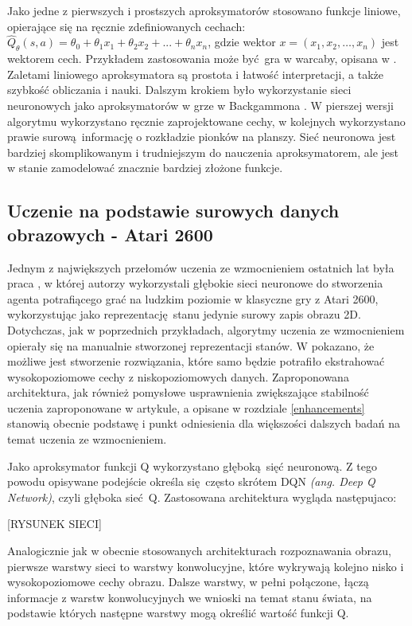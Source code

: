 Jako jedne z pierwszych i prostszych aproksymatorów stosowano funkcje liniowe, opierające się na ręcznie zdefiniowanych cechach: $\hat{Q}_{\theta}(s,a) = \theta_0 + \theta_1x_1 + \theta_2x_2 + ... + \theta_nx_n$, gdzie wektor $x = (x_1, x_2, …, x_n)$ jest wektorem cech. Przykładem zastosowania może być gra w warcaby, opisana w \cite{Samuel:1959:SML:1661923.1661924}. Zaletami liniowego aproksymatora są prostota i łatwość interpretacji, a także szybkość obliczania i nauki. 
Dalszym krokiem było wykorzystanie sieci neuronowych jako aproksymatorów w grze w Backgammona \cite{Tesauro1992451}. W pierszej wersji algorytmu wykorzystano ręcznie zaprojektowane cechy, w kolejnych wykorzystano prawie surową informację o rozkładzie pionków na planszy. Sieć neuronowa jest bardziej skomplikowanym i trudniejszym do nauczenia aproksymatorem, ale jest w stanie zamodelować znacznie bardziej złożone funkcje.

\subsection{Uczenie na podstawie surowych danych obrazowych - Atari 2600}

Jednym z największych przełomów uczenia ze wzmocnieniem ostatnich lat była praca \cite{mnih2015human}, w której autorzy wykorzystali głębokie sieci neuronowe do stworzenia agenta potrafiącego grać na ludzkim poziomie w klasyczne gry z Atari 2600, wykorzystując jako reprezentację stanu jedynie surowy zapis obrazu 2D. Dotychczas, jak w poprzednich przykładach, algorytmy uczenia ze wzmocnieniem opierały się na manualnie stworzonej reprezentacji stanów. W \cite{mnih2015human} pokazano, że możliwe jest stworzenie rozwiązania, które samo będzie potrafiło ekstrahować wysokopoziomowe cechy z niskopoziomowych danych. Zaproponowana architektura, jak również pomysłowe usprawnienia zwiększające stabilność uczenia zaproponowane w artykule, a opisane w rozdziale \ref {enhancements} stanowią obecnie podstawę i punkt odniesienia dla większości dalszych badań na temat uczenia ze wzmocnieniem.

Jako aproksymator funkcji Q wykorzystano głęboką sięć neuronową. Z tego powodu opisywane podejście określa się często skrótem DQN \textit{(ang. Deep Q Network)}, czyli głęboka sieć Q. Zastosowana architektura wygląda następujaco:

[RYSUNEK SIECI]

Analogicznie jak w obecnie stosowanych architekturach rozpoznawania obrazu, pierwsze warstwy sieci to warstwy konwolucyjne, które wykrywają kolejno nisko i wysokopoziomowe cechy obrazu. Dalsze warstwy, w pełni połączone, łączą informacje z warstw konwolucyjnych we wnioski na temat stanu świata, na podstawie których następne warstwy mogą określić wartość funkcji Q.


